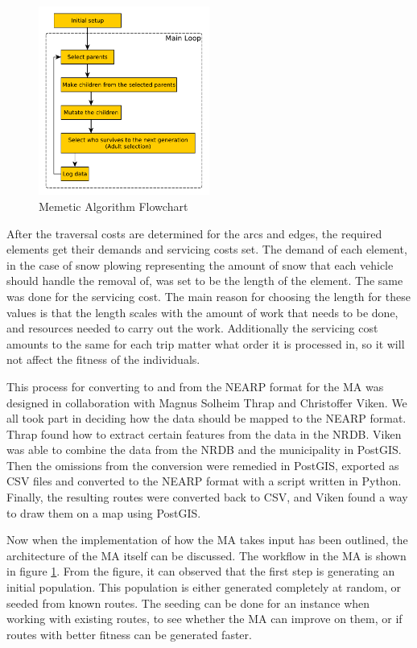 \begin{figure}
    \begin{center}
        \includegraphics[width=0.5\textwidth]{figures/Architecture/MA_flowchart.pdf}
    \end{center}
    \caption{Memetic Algorithm Flowchart}
    \label{fig:ma_flowchart}
\end{figure}

After the traversal costs are determined for the arcs and edges, the required elements get their demands and servicing costs set. The demand of each element, in the case of snow plowing representing the amount of snow that each vehicle should handle the removal of, was set to be the length of the element. The same was done for the servicing cost. The main reason for choosing the length for these values is that the length scales with the amount of work that needs to be done, and resources needed to carry out the work. Additionally the servicing cost amounts to the same for each trip matter what order it is processed in, so it will not affect the fitness of the individuals.

This process for converting to and from the NEARP format for the MA was designed in collaboration with Magnus Solheim Thrap and Christoffer Viken. We all took part in deciding how the data should be mapped to the NEARP format. Thrap found how to extract certain features from the data in the NRDB. Viken was able to combine the data from the NRDB and the municipality in PostGIS. Then the omissions from the conversion were remedied in PostGIS, exported as CSV files and converted to the NEARP format with a script written in Python. Finally, the resulting routes were converted back to CSV, and Viken found a way to draw them on a map using PostGIS.

Now when the implementation of how the MA takes input has been outlined, the architecture of the MA itself can be discussed. The workflow in the MA is shown in figure \ref{fig:ma_flowchart}. From the figure, it can observed that the first step is generating an initial population. This population is either generated completely at random, or seeded from known routes. The seeding can be done for an instance when working with existing routes, to see whether the MA can improve on them, or if routes with better fitness can be generated faster.

